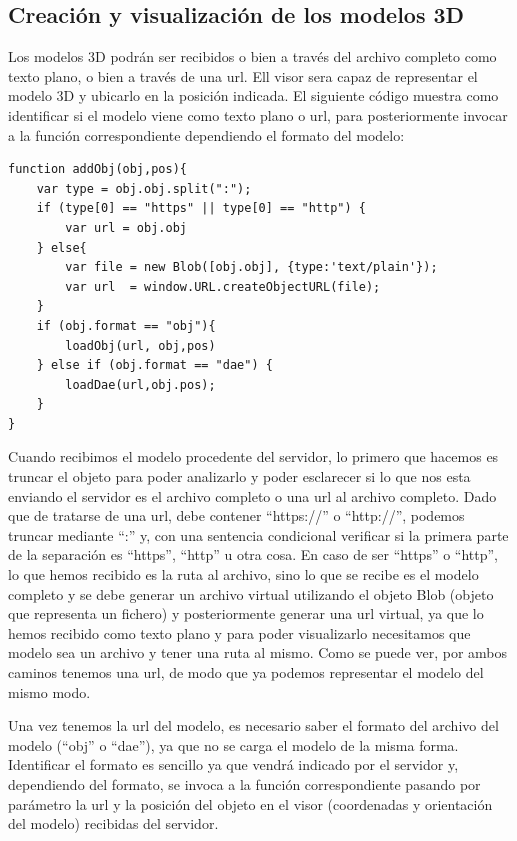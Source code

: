 \subsection{Creación y visualización de los modelos 3D}
Los modelos 3D podrán ser recibidos o bien a través del archivo completo como texto plano, o bien a través de una url. Ell visor sera capaz de representar el modelo 3D y ubicarlo en la posición indicada. El siguiente código muestra como identificar si el modelo viene como texto plano o url, para posteriormente invocar a la función correspondiente dependiendo el formato del modelo:
\begin{lstlisting}[frame=single]
function addObj(obj,pos){
	var type = obj.obj.split(":");
	if (type[0] == "https" || type[0] == "http") {
		var url = obj.obj
	} else{
		var file = new Blob([obj.obj], {type:'text/plain'});
		var url  = window.URL.createObjectURL(file);
	}
	if (obj.format == "obj"){
		loadObj(url, obj,pos)
	} else if (obj.format == "dae") {
		loadDae(url,obj.pos);
	}
}
\end{lstlisting}
Cuando recibimos el modelo procedente del servidor, lo primero que hacemos es truncar el objeto para poder analizarlo y poder esclarecer si lo que nos esta enviando el servidor es el archivo completo o una url al archivo completo. Dado que de tratarse de una url, debe contener ``https://'' o ``http://'', podemos truncar mediante ``:'' y, con una sentencia condicional verificar si la primera parte de la separación es ``https'', ``http'' u otra cosa. En caso de ser ``https'' o ``http'', lo que hemos recibido es la ruta al archivo, sino lo que se recibe es el modelo completo y se debe generar un archivo virtual utilizando el objeto Blob (objeto que representa un fichero) y posteriormente generar una url virtual, ya que lo hemos recibido como texto plano y para poder visualizarlo necesitamos que modelo sea un archivo y tener una ruta al mismo. Como se puede ver, por ambos caminos tenemos una url, de modo que ya podemos representar el modelo del mismo modo.

Una vez tenemos la url del modelo, es necesario saber el formato del archivo del modelo (``obj'' o ``dae''), ya que no se carga el modelo de la misma forma. Identificar el formato es sencillo ya que vendrá indicado por el servidor y, dependiendo del formato, se invoca a la función correspondiente pasando por parámetro la url y la posición del objeto en el visor (coordenadas y orientación del modelo) recibidas del servidor.

